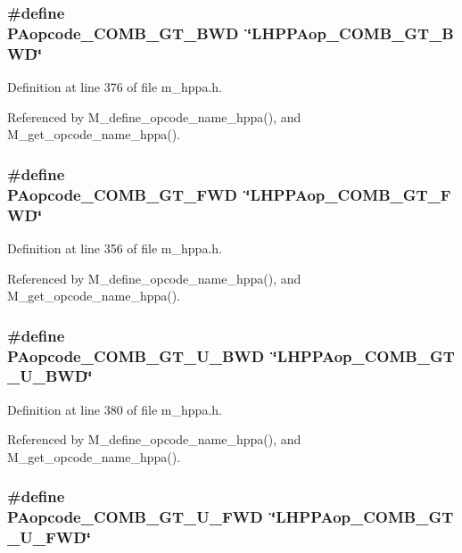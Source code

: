 \subsubsection{\setlength{\rightskip}{0pt plus 5cm}\#define PAopcode\_\-COMB\_\-GT\_\-BWD~\char`\"{}LHPPAop\_\-COMB\_\-GT\_\-BWD\char`\"{}}\label{m__hppa_8h_6de98ab06881bcb6fb38e67eeddbd1ab}




Definition at line 376 of file m\_\-hppa.h.

Referenced by M\_\-define\_\-opcode\_\-name\_\-hppa(), and M\_\-get\_\-opcode\_\-name\_\-hppa().
\subsubsection{\setlength{\rightskip}{0pt plus 5cm}\#define PAopcode\_\-COMB\_\-GT\_\-FWD~\char`\"{}LHPPAop\_\-COMB\_\-GT\_\-FWD\char`\"{}}\label{m__hppa_8h_c41e23047deec39b11cc64d48f0e4439}




Definition at line 356 of file m\_\-hppa.h.

Referenced by M\_\-define\_\-opcode\_\-name\_\-hppa(), and M\_\-get\_\-opcode\_\-name\_\-hppa().
\subsubsection{\setlength{\rightskip}{0pt plus 5cm}\#define PAopcode\_\-COMB\_\-GT\_\-U\_\-BWD~\char`\"{}LHPPAop\_\-COMB\_\-GT\_\-U\_\-BWD\char`\"{}}\label{m__hppa_8h_69d28d394aa8a68a2ad5bf8f9ac302ed}




Definition at line 380 of file m\_\-hppa.h.

Referenced by M\_\-define\_\-opcode\_\-name\_\-hppa(), and M\_\-get\_\-opcode\_\-name\_\-hppa().
\subsubsection{\setlength{\rightskip}{0pt plus 5cm}\#define PAopcode\_\-COMB\_\-GT\_\-U\_\-FWD~\char`\"{}LHPPAop\_\-COMB\_\-GT\_\-U\_\-FWD\char`\"{}}\label{m__hppa_8h_aed1fc1d9a11d57cb1d887d72d5415d4}




